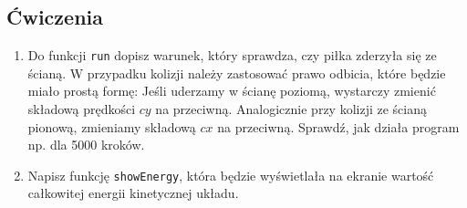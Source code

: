 \documentclass{instrukcja}
\begin{document}
\subsection*{Ćwiczenia}
\begin{enumerate}
\item Do funkcji \verb|run| dopisz warunek, który sprawdza, czy piłka zderzyła się ze ścianą. W przypadku kolizji należy zastosować prawo odbicia, które będzie miało prostą formę:
Jeśli uderzamy w ścianę poziomą, wystarczy zmienić składową prędkości \(cy\) na przeciwną. Analogicznie przy kolizji ze ścianą pionową, zmieniamy składową \(cx\) na przeciwną.
Sprawdź, jak działa program np. dla 5000 kroków.
\item Napisz funkcję {\tt showEnergy}, która będzie wyświetlała na ekranie wartość całkowitej energii kinetycznej układu.

\end{enumerate}
\end{document}
